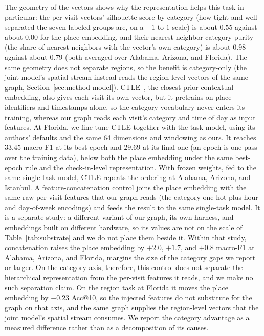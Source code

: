 The geometry of the vectors shows why the representation helps this task in
particular: the per-visit vectors' silhouette score by category (how tight and well separated the seven labeled groups are, on a $-1$ to $1$ scale) is about $0.55$ against about $0.00$ for the place embedding, and their nearest-neighbor category purity (the share of nearest neighbors with the vector's own category) is about $0.98$ against about $0.79$ (both averaged over Alabama, Arizona, and Florida). The same geometry does not separate regions, so the benefit is category-only (the joint model's spatial stream instead reads the region-level vectors of the same graph, Section~\ref{sec:method-model}). CTLE~\cite{lin2021ctle}, the closest prior contextual embedding, also gives each visit its own vector, but it pretrains on place identifiers and timestamps alone, so the category vocabulary never enters its training, whereas our graph reads each visit's category and time of day as input features. At Florida, we fine-tune CTLE together with the task model, using its authors' defaults and the same 64 dimensions and windowing as ours. It reaches $33.45$ macro-F1 at its best epoch and $29.69$ at its final one (an epoch is one pass over the training data), below both the place embedding under the same best-epoch rule and the check-in-level representation. With frozen weights, fed to the same single-task model, CTLE repeats the ordering at Alabama, Arizona, and Istanbul. A feature-concatenation control joins the place embedding with the same raw
per-visit features that our graph reads (the category one-hot plus hour and
day-of-week encodings) and feeds the result to the same single-task model. It is a separate study: a
different variant of our graph, its own harness, and embeddings built on different hardware, so its
values are not on the scale of Table~\ref{tab:substrate} and we do not place them beside it. Within
that study, concatenation raises the place embedding by $+2.0$, $+1.7$, and $+0.8$ macro-F1 at
Alabama, Arizona, and Florida, margins the size of the category gaps we report or larger. On the
category axis, therefore, this control does not separate the hierarchical representation from the
per-visit features it reads, and we make no such separation claim. On the region task at Florida it
moves the place embedding by $-0.23$ Acc@10, so the injected features do not substitute for the graph
on that axis, and the same graph supplies the region-level vectors that the joint model's spatial
stream consumes. We report the category advantage as a measured difference rather than as a
decomposition of its causes.

